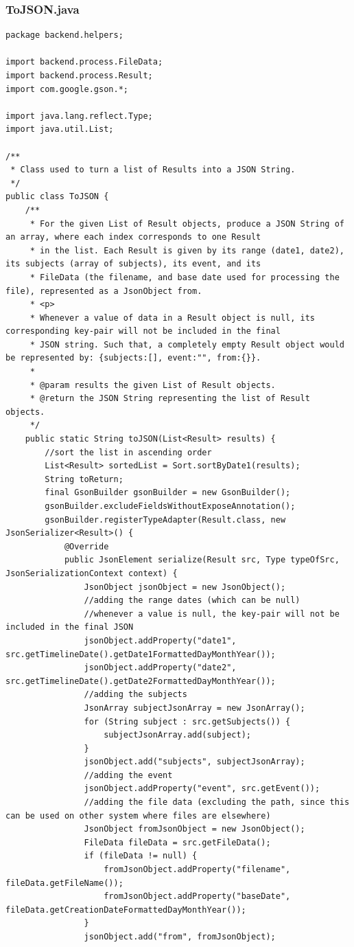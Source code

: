 \subsubsection{ToJSON.java}
\begin{lstlisting}
package backend.helpers;

import backend.process.FileData;
import backend.process.Result;
import com.google.gson.*;

import java.lang.reflect.Type;
import java.util.List;

/**
 * Class used to turn a list of Results into a JSON String.
 */
public class ToJSON {
    /**
     * For the given List of Result objects, produce a JSON String of an array, where each index corresponds to one Result
     * in the list. Each Result is given by its range (date1, date2), its subjects (array of subjects), its event, and its
     * FileData (the filename, and base date used for processing the file), represented as a JsonObject from.
     * <p>
     * Whenever a value of data in a Result object is null, its corresponding key-pair will not be included in the final
     * JSON string. Such that, a completely empty Result object would be represented by: {subjects:[], event:"", from:{}}.
     *
     * @param results the given List of Result objects.
     * @return the JSON String representing the list of Result objects.
     */
    public static String toJSON(List<Result> results) {
        //sort the list in ascending order
        List<Result> sortedList = Sort.sortByDate1(results);
        String toReturn;
        final GsonBuilder gsonBuilder = new GsonBuilder();
        gsonBuilder.excludeFieldsWithoutExposeAnnotation();
        gsonBuilder.registerTypeAdapter(Result.class, new JsonSerializer<Result>() {
            @Override
            public JsonElement serialize(Result src, Type typeOfSrc, JsonSerializationContext context) {
                JsonObject jsonObject = new JsonObject();
                //adding the range dates (which can be null)
                //whenever a value is null, the key-pair will not be included in the final JSON
                jsonObject.addProperty("date1", src.getTimelineDate().getDate1FormattedDayMonthYear());
                jsonObject.addProperty("date2", src.getTimelineDate().getDate2FormattedDayMonthYear());
                //adding the subjects
                JsonArray subjectJsonArray = new JsonArray();
                for (String subject : src.getSubjects()) {
                    subjectJsonArray.add(subject);
                }
                jsonObject.add("subjects", subjectJsonArray);
                //adding the event
                jsonObject.addProperty("event", src.getEvent());
                //adding the file data (excluding the path, since this can be used on other system where files are elsewhere)
                JsonObject fromJsonObject = new JsonObject();
                FileData fileData = src.getFileData();
                if (fileData != null) {
                    fromJsonObject.addProperty("filename", fileData.getFileName());
                    fromJsonObject.addProperty("baseDate", fileData.getCreationDateFormattedDayMonthYear());
                }
                jsonObject.add("from", fromJsonObject);


\end{lstlisting}
